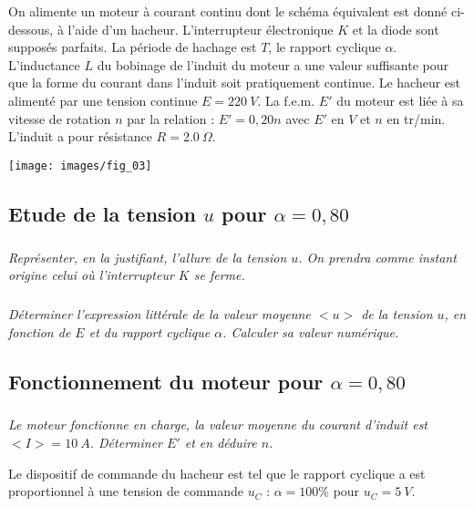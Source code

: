 \documentclass[10pt,fleqn]{article} %
\begin{document}
\begin{multicols}{2}
\begin{multicols}{2}
\setcounter{exo}{0}

On alimente un moteur à courant continu dont le schéma équivalent est donné ci-dessous, à
l'aide d'un hacheur.
L'interrupteur électronique $K$ et la diode sont supposés parfaits.
La période de hachage est $T$, le rapport cyclique $\alpha$.
L'inductance $L$ du bobinage de l'induit du moteur a une valeur suffisante pour que la forme du
courant dans l'induit soit pratiquement continue.
Le hacheur est alimenté par une tension continue $E = \SI{220}{V}$.
La f.e.m. $E'$ du moteur est liée à sa vitesse de rotation $n$ par la relation :
$E' = 0,20 n$ avec $E'$ en $V$ et $n$ en tr/min. L'induit a pour résistance $R = \SI{2,0}{\Omega}$.

\begin{center}
\texttt{[image: images/fig\_03]}
\end{center}


\subsection*{Etude de la tension $u$ pour $\alpha = 0,80$}
\subparagraph{}\textit{Représenter, en la justifiant, l'allure de la tension $u$.
On prendra comme instant origine celui où l'interrupteur $K$ se ferme.}
\ifprof
\begin{corrige}
\end{corrige}
\else
\fi

\subparagraph{}\textit{Déterminer l'expression littérale de la valeur moyenne $< u >$ de la tension $u$, en fonction
de $E$ et du rapport cyclique $\alpha$. Calculer sa valeur numérique.}
\ifprof
\begin{corrige}
\end{corrige}
\else
\fi



\subsection*{Fonctionnement du moteur pour $\alpha = 0,80$}
\subparagraph{}\textit{Le moteur fonctionne en charge, la valeur moyenne du courant d'induit est $< I > = \SI{10}{A}$.
Déterminer $E'$ et en déduire $n$.}
\ifprof
\begin{corrige}
\end{corrige}
\else
\fi


Le dispositif de commande du hacheur est tel que le rapport cyclique a est proportionnel à
une tension de commande $u_C$ : $\alpha = 100\%$ pour $u_C =\SI{5}{V}$.


\end{multicols}
\end{multicols}
\end{document}
